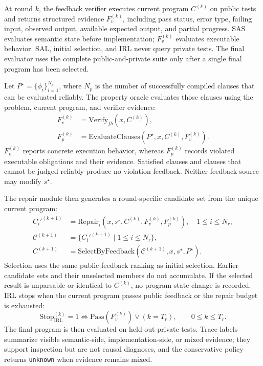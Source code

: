 At round $k$, the feedback verifier executes current program $C^{(k)}$ on public tests and returns structured evidence $F_v^{(k)}$, including pass status, error type, failing input, observed output, available expected output, and partial progress. SAS evaluates semantic state before implementation; $F_v^{(k)}$ evaluates executable behavior. SAL, initial selection, and IRL never query private tests. The final evaluator uses the complete public-and-private suite only after a single final program has been selected.

Let $P^\star=\{\phi_i\}_{i=1}^{N_p}$, where $N_p$ is the number of successfully compiled clauses that can be evaluated reliably. The property oracle evaluates those clauses using the problem, current program, and verifier evidence:
\begin{equation}
\begin{aligned}
F_v^{(k)}&=\mathrm{Verify}_{fb}(x,C^{(k)}),\\
F_p^{(k)}&=\mathrm{EvaluateClauses}(P^\star,x,C^{(k)},F_v^{(k)}).
\end{aligned}
\label{eq:feedback}
\end{equation}
$F_v^{(k)}$ reports concrete execution behavior, whereas $F_p^{(k)}$ records violated executable obligations and their evidence. Satisfied clauses and clauses that cannot be judged reliably produce no violation feedback. Neither feedback source may modify $s^\star$.

The repair module then generates a round-specific candidate set from the unique current program:
\begin{equation}
\begin{aligned}
C_i'^{(k+1)}&=\mathrm{Repair}_i(x,s^\star,C^{(k)},F_v^{(k)},F_p^{(k)}),\quad 1\leq i\leq N_r,\\
\mathcal C^{(k+1)}&=\{C_i'^{(k+1)}\mid 1\leq i\leq N_r\},\\
C^{(k+1)}&=\mathrm{SelectByFeedback}(\mathcal C^{(k+1)},x,s^\star,P^\star).
\end{aligned}
\label{eq:repair}
\end{equation}
Selection uses the same public-feedback ranking as initial selection. Earlier candidate sets and their unselected members do not accumulate. If the selected result is unparsable or identical to $C^{(k)}$, no program-state change is recorded. IRL stops when the current program passes public feedback or the repair budget is exhausted:
\begin{equation}
\mathrm{Stop}_{\mathrm{IRL}}^{(k)}=1\iff
\mathrm{Pass}(F_v^{(k)})\lor(k=T_r),\qquad 0\leq k\leq T_r.
\label{eq:stop}
\end{equation}
The final program is then evaluated on held-out private tests. Trace labels summarize visible semantic-side, implementation-side, or mixed evidence; they support inspection but are not causal diagnoses, and the conservative policy returns \texttt{unknown} when evidence remains mixed.
